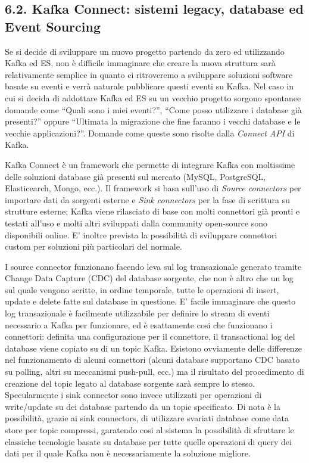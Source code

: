 \documentclass[]{article}
\begin{document}
\subsection{6.2. Kafka Connect: sistemi legacy, database ed Event
Sourcing}\label{kafka-connect-sistemi-legacy-database-ed-event-sourcing}

Se si decide di sviluppare un nuovo progetto partendo da zero ed
utilizzando Kafka ed ES, non è difficile immaginare che creare la nuova
struttura sarà relativamente semplice in quanto ci ritroveremo a
sviluppare soluzioni software basate su eventi e verrà naturale
pubblicare questi eventi su Kafka. Nel caso in cui si decida di
addottare Kafka ed ES su un vecchio progetto sorgono spontanee domande
come ``Quali sono i miei eventi?'', ``Come posso utilizzare i database
già presenti?'' oppure ``Ultimata la migrazione che fine faranno i
vecchi database e le vecchie applicazioni?''. Domande come queste sono
risolte dalla \emph{Connect API} di Kafka.

Kafka Connect è un framework che permette di integrare Kafka con
moltissime delle soluzioni database già presenti sul mercato (MySQL,
PostgreSQL, Elasticearch, Mongo, ecc.). Il framework si basa sull'uso di
\emph{Source connectors} per importare dati da sorgenti esterne e
\emph{Sink connectors} per la fase di scrittura su strutture esterne;
Kafka viene rilasciato di base con molti connettori già pronti e testati
all'uso e molti altri sviluppati dalla community open-source sono
disponibili online. E' inoltre prevista la possibilità di sviluppare
connettori custom per soluzioni più particolari del normale.

I source connector funzionano facendo leva sul log transazionale
generato tramite Change Data Capture (CDC) del database sorgente, che
non è altro che un log sul quale vengono scritte, in ordine temporale,
tutte le operazioni di insert, update e delete fatte sul database in
questione. E' facile immaginare che questo log transazionale è
facilmente utilizzabile per definire lo stream di eventi necessario a
Kafka per funzionare, ed è esattamente cosi che funzionano i connettori:
definita una configurazione per il connettore, il transactional log del
database viene copiato su di un topic Kafka. Esistono ovviamente delle
differenze nel funzionamento di alcuni connettori (alcuni database
supportano CDC basato su polling, altri su meccanismi push-pull, ecc.)
ma il risultato del procedimento di creazione del topic legato al
database sorgente sarà sempre lo stesso. Specularmente i sink connector
sono invece utilizzati per operazioni di write/update su dei database
partendo da un topic specificato. Di nota è la possibilità, grazie ai
sink connectors, di utilizzare svariati database come data store per
topic compressi, garatendo cosi al sistema la possibilità di sfruttare
le classiche tecnologie basate su database per tutte quelle operazioni
di query dei dati per il quale Kafka non è necessariamente la soluzione
migliore.
\end{document}
